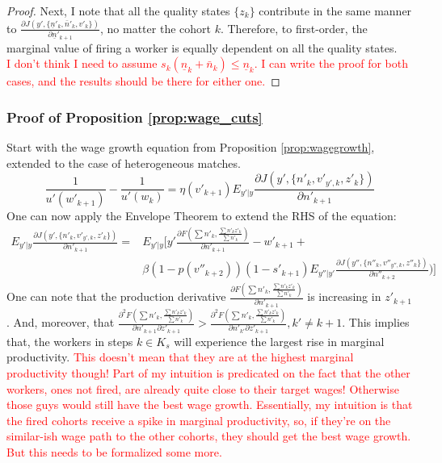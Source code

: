 \begin{proof}
Next, I note that all the quality states $\{z_k\}$ contribute in the same manner to $\frac{\partial J(y',\{\underline{n}'_k,\bar{n}'_k,v'_k\})}{\partial \underline{n}'_{k+1}}$, no matter the cohort $k$. Therefore, to first-order, the marginal value of firing a worker is equally dependent on all the quality states. \\
\textcolor{red}{I don't think I need to assume $s_k(\underline{n}_k + \bar{n}_k) \leq \underline{n}_k$. I can write the proof for both cases, and the results should be there for either one.}
\end{proof}

\subsubsection*{Proof of Proposition \ref{prop:wage_cuts}} \label{proof:wage_cuts}
 Start with the wage growth equation from Proposition \ref{prop:wagegrowth}, extended to the case of heterogeneous matches. 
     \[\frac{1}{u'(w'_{k+1})} - \frac{1}{u'(w_k)} = \eta(v'_{k+1}) E_{y'|y} \frac{\partial J(y',\{n'_k,v'_{y',k},z'_k\})}{\partial n'_{k+1}}\]
     One can now apply the Envelope Theorem to extend the RHS of the equation:
     \begin{align*}
     E_{y'|y} \frac{\partial J(y',\{n'_k,v'_{y',k},z'_k\})}{\partial n'_{k+1}}  = & E_{y'|y}\Big[y'\frac{\partial F(\sum n'_k,\frac{\sum n'_k z'_k}{\sum n'_k})}{\partial n'_{k+1}} - w'_{k+1} + \\
     & \beta (1-p(v''_{k+2}))(1-s'_{k+1})E_{y''|y'} \frac{\partial J(y'',\{n''_k,v''_{y'',k},z''_k\})}{\partial n''_{k+2}})\Big]      
     \end{align*}
     One can note that the production derivative $\frac{\partial F(\sum n'_k,\frac{\sum n'_k z'_k}{\sum n'_k})}{\partial n'_{k+1}}$ is increasing in $z'_{k+1}$. And, moreover, that $\frac{\partial^2 F(\sum n'_k,\frac{\sum n'_k z'_k}{\sum n'_k})}{\partial n'_{k+1} \partial z'_{k+1}}> \frac{\partial^2 F(\sum n'_k,\frac{\sum n'_k z'_k}{\sum n'_k})}{\partial n'_{k'} \partial z'_{k+1}}, k'\neq k+1$. This implies that, the workers in steps $k \in K_s$ will experience the largest rise in marginal productivity. \textcolor{red}{This doesn't mean that they are at the highest marginal productivity though! Part of my intuition is predicated on the fact that the other workers, ones not fired, are already quite close to their target wages! Otherwise those guys would still have the best wage growth. Essentially, my intuition is that the fired cohorts receive a spike in marginal productivity, so, if they're on the similar-ish wage path to the other cohorts, they should get the best wage growth. But this needs to be formalized some more.}

